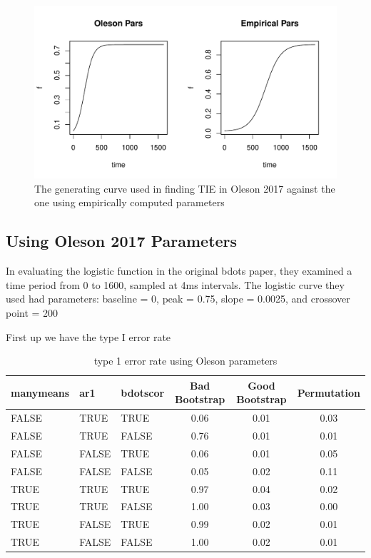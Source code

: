 \documentclass{article}
\begin{document}
\begin{figure}[H]
\centering
\includegraphics{img/compare_par_plot.pdf}
\caption{The generating curve used in finding TIE in Oleson 2017 against the one using empirically computed parameters}
\end{figure}

\subsection{Using Oleson 2017 Parameters}

In evaluating the logistic function in the original bdots paper, they examined a time period from 0 to 1600, sampled at 4ms intervals. The logistic curve they used had parameters: baseline = 0, peak = 0.75, slope = 0.0025, and crossover point = 200

First up we have the type I error rate

\begin{table}[H]
\centering
\begin{tabular}{lllccc}
  \hline
  manymeans & ar1 & bdotscor &  Bad Bootstrap & Good Bootstrap & Permutation  \\ 
  \hline
FALSE & TRUE & TRUE & 0.06 & 0.01 & 0.03 \\ 
  FALSE & TRUE & FALSE & 0.76 & 0.01 & 0.01 \\ 
  FALSE & FALSE & TRUE & 0.06 & 0.01 & 0.05 \\ 
  FALSE & FALSE & FALSE & 0.05 & 0.02 & 0.11 \\ 
  TRUE & TRUE & TRUE & 0.97 & 0.04 & 0.02 \\ 
  TRUE & TRUE & FALSE & 1.00 & 0.03 & 0.00 \\ 
  TRUE & FALSE & TRUE & 0.99 & 0.02 & 0.01 \\ 
  TRUE & FALSE & FALSE & 1.00 & 0.02 & 0.01 \\ 
   \hline
\end{tabular}
\caption{type 1 error rate using Oleson parameters}
\end{table}
\end{document}
